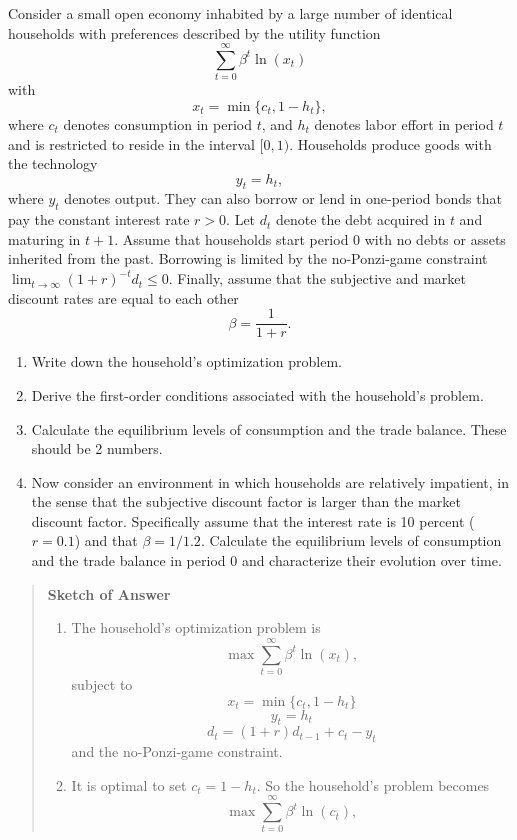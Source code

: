 \begin{exercise}

 Consider a small open economy inhabited by a large number of identical households with preferences described by the utility function
\[
\sum_{t=0}^{\infty} \beta^t \ln( x_t)
\]
with 
\[
x_t = \min\{c_t,1-h_t\},
\]
where $c_t$ denotes consumption in period $t$, 
and $h_t$ denotes labor effort
in period $t$ and is restricted to  reside in the interval $[0,1)$. 
Households  produce goods with  the technology 
\[
y_t=h_t,
\]
 where $y_t$ denotes output. They can also borrow or lend 
in one-period bonds that pay  the constant interest rate $r>0$. Let $d_t$ denote the debt acquired in $t$ and maturing in $t+1$. Assume that  households start period 0 with no debts or assets inherited from the past.  Borrowing is limited by the no-Ponzi-game constraint $\lim_{t\rightarrow \infty}(1+r)^{-t}d_t\le0$. Finally, assume that the subjective and market discount rates are equal to each other
\[\beta = \frac1{1+r}.\]

\begin{enumerate}
\item Write down the household's optimization problem. 
\item Derive the first-order conditions associated with the household's problem.
\item Calculate the equilibrium levels of consumption and the trade balance. These should  be 2 numbers. 
\item Now consider an environment  in which households are relatively impatient, in the sense that the subjective discount factor is larger than the market discount factor. Specifically assume that the interest rate is 10 percent ($r=0.1$) and that $\beta=1/1.2$.  Calculate the equilibrium levels  of consumption and the trade balance in period 0 and characterize their evolution over time. 
\end{enumerate}

\begin{quote}
{\bf Sketch of Answer}
\begin{enumerate}
\item  The household's optimization problem is
\[ \max \sum_{t=0}^{\infty} \beta^t \ln( x_t),\]
subject to 
\[
x_t = \min\{c_t,1-h_t\}
\]
\[
y_t = h_t
\]
\[
d_t = (1+r) d_{t-1} +c_t -y_t
\]
and the no-Ponzi-game constraint. 
\item It is optimal to set $c_t = 1-h_t$. So the household's problem becomes
\[ \max \sum_{t=0}^{\infty} \beta^t \ln( c_t),\]


\end{enumerate}
\end{quote}
\end{exercise}
